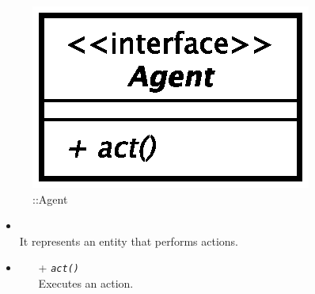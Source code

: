 \begin{figure}[h]
\centering
\includegraphics[scale=0.6,keepaspectratio]{images/solution/app/backend/agent.eps}
\caption{\pActive::Agent}
\label{fig:sd-app-agent}
\end{figure}
\FloatBarrier
\begin{itemize}
  \item \textbf{\descr} \\
    It represents an entity that performs actions.
  \item \textbf{\ops}
  \begin{itemize}
    \item[+]  \texttt{\textit{act()}} \\
    Executes an action.
  \end{itemize}
\end{itemize}
